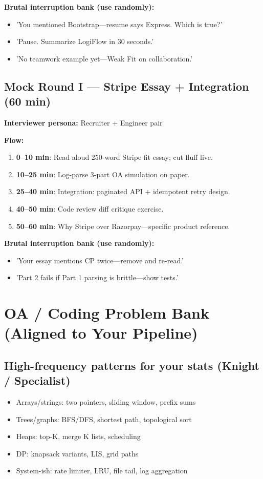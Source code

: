 \documentclass[9pt,a4paper]{article}
\begin{document}
\textbf{Brutal interruption bank (use randomly):}
\begin{itemize}
  \item 'You mentioned Bootstrap---resume says Express. Which is true?'
  \item 'Pause. Summarize LogiFlow in 30 seconds.'
  \item 'No teamwork example yet---Weak Fit on collaboration.'
\end{itemize}

\subsection{Mock Round I --- Stripe Essay + Integration (60 min)}
\textbf{Interviewer persona:} Recruiter + Engineer pair

\textbf{Flow:}
\begin{enumerate}
  \item \textbf{0--10 min}: Read aloud 250-word Stripe fit essay; cut fluff live.
  \item \textbf{10--25 min}: Log-parse 3-part OA simulation on paper.
  \item \textbf{25--40 min}: Integration: paginated API + idempotent retry design.
  \item \textbf{40--50 min}: Code review diff critique exercise.
  \item \textbf{50--60 min}: Why Stripe over Razorpay---specific product reference.
\end{enumerate}

\textbf{Brutal interruption bank (use randomly):}
\begin{itemize}
  \item 'Your essay mentions CP twice---remove and re-read.'
  \item 'Part 2 fails if Part 1 parsing is brittle---show tests.'
\end{itemize}


\section{OA / Coding Problem Bank (Aligned to Your Pipeline)}
\subsection{High-frequency patterns for your stats (Knight / Specialist)}
\begin{itemize}
  \item Arrays/strings: two pointers, sliding window, prefix sums
  \item Trees/graphs: BFS/DFS, shortest path, topological sort
  \item Heaps: top-K, merge K lists, scheduling
  \item DP: knapsack variants, LIS, grid paths
  \item System-ish: rate limiter, LRU, file tail, log aggregation
\end{itemize}
\end{document}
